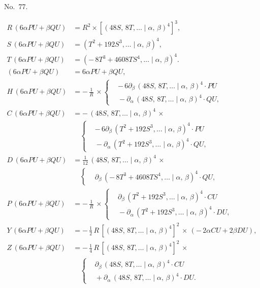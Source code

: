 \documentclass[11pt]{article}
\newcommand{\Cdel}{\mid}
\begin{document}
\begin{center}No.~77.\end{center}
\[
\begin{aligned}
   R\,(6\alpha P U + \beta Q U) &= R^2\times[(48 S,\,8 T,\ldots\Cdel\alpha,\,\beta)^4]^3,\\
   S\,(6\alpha P U + \beta Q U) &= (T^2 + 192 S^3,\ldots\Cdel\alpha,\,\beta)^4,\\
   T\,(6\alpha P U + \beta Q U) &= (-\,8 T^3 + 4608 T S^4,\ldots\Cdel\alpha,\,\beta)^4.\\[6pt]
   (6\alpha P U + \beta Q U) &= 6\alpha P U + \beta Q U,\\
   H\,(6\alpha P U + \beta Q U) &= -\,\tfrac{1}{R}\,\times\left\{\begin{aligned}&-\,6\partial_\beta\,(48 S,\,8 T,\ldots\Cdel\alpha,\,\beta)^4\cdot P U\\ &{} - \partial_\alpha\,(48 S,\,8 T,\ldots\Cdel\alpha,\,\beta)^4\cdot Q U,\end{aligned}\right.\\
   C\,(6\alpha P U + \beta Q U) &= -\,(48 S,\,8 T,\ldots\Cdel\alpha,\,\beta)^4\,\times\\
                                 &\quad\left\{\begin{aligned}&-\,6\partial_\beta\,(T^2 + 192 S^3,\ldots\Cdel\alpha,\,\beta)^4\cdot P U\\ &{} - \partial_\alpha\,(T^2 + 192 S^3,\ldots\Cdel\alpha,\,\beta)^4\cdot Q U,\end{aligned}\right.\\
   D\,(6\alpha P U + \beta Q U) &= \tfrac{1}{12}\,(48 S,\,8 T,\ldots\Cdel\alpha,\,\beta)^4\,\times\\
                                 &\quad\left\{\begin{aligned}&\partial_\beta\,(-\,8 T^3 + 4608 T S^4,\ldots\Cdel\alpha,\,\beta)^4\cdot Q U,\end{aligned}\right.\\
   P\,(6\alpha P U + \beta Q U) &= -\,\tfrac{1}{R}\,\times\left\{\begin{aligned}&\partial_\beta\,(T^2 + 192 S^3,\ldots\Cdel\alpha,\,\beta)^4\cdot C U\\ &{} - \partial_\alpha\,(T^2 + 192 S^3,\ldots\Cdel\alpha,\,\beta)^4\cdot D U,\end{aligned}\right.\\
   Y\,(6\alpha P U + \beta Q U) &= -\,\tfrac{1}{2}\,R\,[(48 S,\,8 T,\ldots\Cdel\alpha,\,\beta)^4]^2\,\times\,(-\,2\alpha C U + 2\beta D U),\\
   Z\,(6\alpha P U + \beta Q U) &= -\,\tfrac{1}{4}\,R\,[(48 S,\,8 T,\ldots\Cdel\alpha,\,\beta)^4]^2\,\times\\
                                 &\quad\left\{\begin{aligned}&\partial_\beta\,(48 S,\,8 T,\ldots\Cdel\alpha,\,\beta)^4\cdot C U\\ &{} + \partial_\alpha\,(48 S,\,8 T,\ldots\Cdel\alpha,\,\beta)^4\cdot D U.\end{aligned}\right.
\end{aligned}
\]
\end{document}
